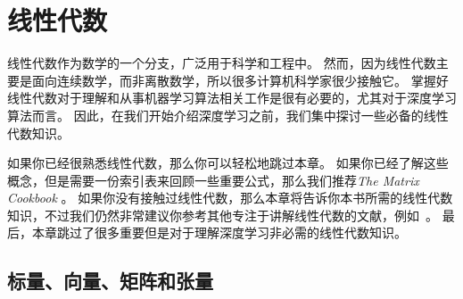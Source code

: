 \chapter{线性代数}
\label{chap:linear_algebra}

线性代数作为数学的一个分支，广泛用于科学和工程中。
然而，因为线性代数主要是面向连续数学，而非离散数学，所以很多计算机科学家很少接触它。
掌握好线性代数对于理解和从事机器学习算法相关工作是很有必要的，尤其对于深度学习算法而言。
因此，在我们开始介绍深度学习之前，我们集中探讨一些必备的线性代数知识。


如果你已经很熟悉线性代数，那么你可以轻松地跳过本章。
如果你已经了解这些概念，但是需要一份索引表来回顾一些重要公式，那么我们推荐\emph{The Matrix Cookbook} \citep{matrix-cookbook}。
如果你没有接触过线性代数，那么本章将告诉你本书所需的线性代数知识，不过我们仍然非常建议你参考其他专注于讲解线性代数的文献，例如~\cite{shilov1977linear}。
最后，本章跳过了很多重要但是对于理解深度学习非必需的线性代数知识。




\section{标量、向量、矩阵和张量}
\label{sec:scalars_vectors_matrices_and_tensors}

